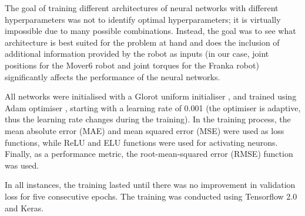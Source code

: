 The goal of training different architectures of neural networks with different hyperparameters was not to identify optimal hyperparameters; it is virtually impossible due to many possible combinations. Instead, the goal was to see what architecture is best suited for the problem at hand and does the inclusion of additional information provided by the robot as inputs (in our case, joint positions for the Mover6 robot and joint torques for the Franka robot) significantly affects the performance of the neural networks.

All networks were initialised with a Glorot uniform initialiser \cite{Glorot2010}, and trained using Adam optimiser \cite{Kingma2014}, starting with a learning rate of 0.001 (the optimiser is adaptive, thus the learning rate changes during the training). In the training process, the mean absolute error (MAE) and mean squared error (MSE) were used as loss functions, while ReLU and ELU functions were used for activating neurons. Finally, as a performance metric, the root-mean-squared error (RMSE) function was used.

In all instances, the training lasted until there was no improvement in validation loss for five consecutive epochs. The training was conducted using Tensorflow 2.0 and Keras.

\newpage